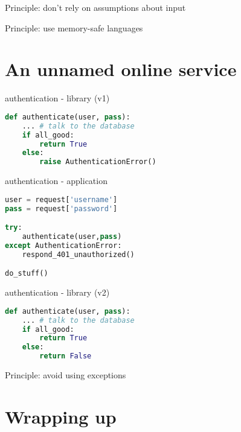 \documentclass[ignorenonframetext,aspectratio=169]{beamer}
\begin{document}
\begin{frame}[plain]
\huge
Principle: don't rely on assumptions about input
\end{frame}

\begin{frame}[plain]
\huge
Principle: use memory-safe languages
\end{frame}






\section{An unnamed online service}\label{unnamed}

\begin{frame}[fragile]{authentication - library (v1)}
\begin{lstlisting}[language=Python]
def authenticate(user, pass):
    ... # talk to the database
    if all_good:
        return True
    else:
        raise AuthenticationError()
\end{lstlisting}
\end{frame}

\begin{frame}[fragile]{authentication - application}
\begin{lstlisting}[language=Python]
user = request['username']
pass = request['password']

try:
    authenticate(user,pass)
except AuthenticationError:
    respond_401_unauthorized()

do_stuff()
\end{lstlisting}
\end{frame}

\begin{frame}[fragile]{authentication - library (v2)}
\begin{lstlisting}[language=Python]
def authenticate(user, pass):
    ... # talk to the database
    if all_good:
        return True
    else:
        return False
\end{lstlisting}
\end{frame}

\begin{frame}[plain]
\huge
Principle: avoid using exceptions
\end{frame}




\section{Wrapping up}\label{wrapping-up}
\end{document}

